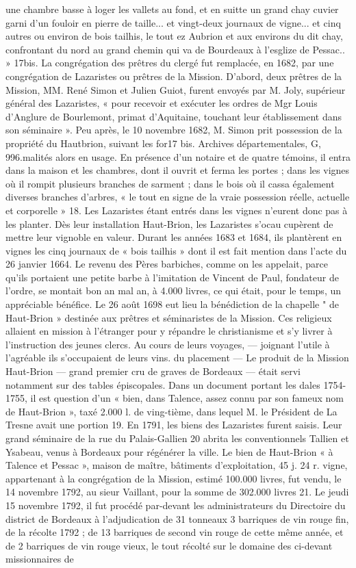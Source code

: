 une chambre basse à loger les vallets au fond, et en suitte un grand chay cuvier garni d'un fouloir en pierre de taille... et vingt-deux journaux de vigne... et cinq autres ou environ de bois tailhis, le tout ez Aubrion et aux environs du dit chay, confrontant du nord au grand chemin qui va de Bourdeaux à l'esglize de Pessac.. » 17bis. La congrégation des prêtres du clergé fut remplacée, en 1682, par une congrégation de Lazaristes ou prêtres de la Mission. D'abord, deux prêtres de la Mission, MM. René Simon et Julien Guiot, furent envoyés par M. Joly, supérieur général des Lazaristes, « pour recevoir et exécuter les ordres de Mgr Louis d'Anglure de Bourlemont, primat d'Aquitaine, touchant leur établissement dans son séminaire ». Peu après, le 10 novembre 1682, M. Simon prit possession de la propriété du Hautbrion, suivant les for17 bis. Archives départementales, G, 996.malités alors en usage. En présence d'un notaire et de quatre témoins, il entra dans la maison et les chambres, dont il ouvrit et ferma les portes ; dans les vignes où il rompit plusieurs branches de sarment ; dans le bois où il cassa également diverses branches d'arbres, « le tout en signe de la vraie possession réelle, actuelle et corporelle » 18. Les Lazaristes étant entrés dans les vignes n'eurent donc pas à les planter. Dès leur installation Haut-Brion, les Lazaristes s'ocau cupèrent de mettre leur vignoble en valeur. Durant les années 1683 et 1684, ils plantèrent en vignes les cinq journaux de « bois tailhis » dont il est fait mention dans l'acte du 26 janvier 1664. Le revenu des Pères barbiches, comme on les appelait, parce qu'ils portaient une petite barbe à l'imitation de Vincent de Paul, fondateur de l'ordre, se montait bon an mal an, à 4.000 livres, ce qui était, pour le temps, un appréciable bénéfice. Le 26 août 1698 eut lieu la bénédiction de la chapelle " de Haut-Brion » destinée aux prêtres et séminaristes de la Mission. Ces religieux allaient en mission à l'étranger pour y répandre le christianisme et s'y livrer à l'instruction des jeunes clercs. Au cours de leurs voyages, — joignant l'utile à l'agréable ils s'occupaient de leurs vins. du placement — Le produit de la Mission Haut-Brion — grand premier cru de graves de Bordeaux — était servi notamment sur des tables épiscopales. Dans un document portant les dales 1754-1755, il est question d'un « bien, dans Talence, assez connu par son fameux nom de Haut-Brion », taxé 2.000 l. de ving-tième, dans lequel M. le Président de La Tresne avait une portion 19. En 1791, les biens des Lazaristes furent saisis. Leur grand séminaire de la rue du Palais-Gallien 20 abrita les conventionnels Tallien et Ysabeau, venus à Bordeaux pour régénérer la ville. Le bien de Haut-Brion « à Talence et Pessac », maison de maître, bâtiments d'exploitation, 45 j. 24 r. vigne, appartenant à la congrégation de la Mission, estimé 100.000 livres, fut vendu, le 14 novembre 1792, au sieur Vaillant, pour la somme de 302.000 livres 21. Le jeudi 15 novembre 1792, il fut procédé par-devant les administrateurs du Directoire du district de Bordeaux à l'adjudication de 31 tonneaux 3 barriques de vin rouge fin, de la récolte 1792 ; de 13 barriques de second vin rouge de cette même année, et de 2 barriques de vin rouge vieux, le tout récolté sur le domaine des ci-devant missionnaires de 